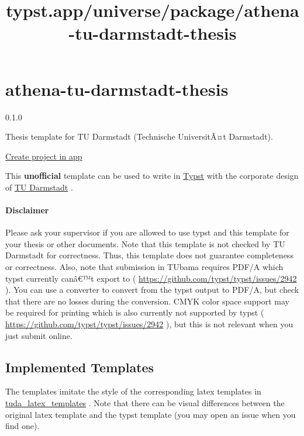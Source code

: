 \title{typst.app/universe/package/athena-tu-darmstadt-thesis}

\label{banner}
\label{template-thumbnail}

\section{athena-tu-darmstadt-thesis}\label{athena-tu-darmstadt-thesis}

{ 0.1.0 }

Thesis template for TU Darmstadt (Technische UniversitÃ¤t Darmstadt).

\href{/app?template=athena-tu-darmstadt-thesis&version=0.1.0}{Create
project in app}

\label{readme}
This \textbf{unofficial} template can be used to write in
\href{https://github.com/typst/typst}{Typst} with the corporate design
of \href{https://www.tu-darmstadt.de/}{TU Darmstadt} .

\paragraph{Disclaimer}\label{disclaimer}

Please ask your supervisor if you are allowed to use typst and this
template for your thesis or other documents. Note that this template is
not checked by TU Darmstadt for correctness. Thus, this template does
not guarantee completeness or correctness. Also, note that submission in
TUbama requires PDF/A which typst currently canâ€™t export to (
\url{https://github.com/typst/typst/issues/2942} ). You can use a
converter to convert from the typst output to PDF/A, but check that
there are no losses during the conversion. CMYK color space support may
be required for printing which is also currently not supported by typst
( \url{https://github.com/typst/typst/issues/2942} ), but this is not
relevant when you just submit online.

\subsection{Implemented Templates}\label{implemented-templates}

The templates imitate the style of the corresponding latex templates in
\href{https://github.com/tudace/tuda_latex_templates}{tuda\_latex\_templates}
. Note that there can be visual differences between the original latex
template and the typst template (you may open an issue when you find
one).

